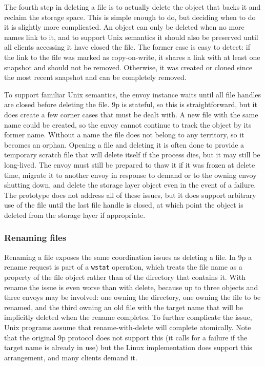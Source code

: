 The fourth step in deleting a file is to actually delete the object that backs it and reclaim the storage space. This is simple enough to do, but deciding when to do it is slightly more complicated. An object can only be deleted when no more names link to it, and to support Unix semantics it should also be preserved until all clients accessing it have closed the file. The former case is easy to detect: if the link to the file was marked as copy-on-write, it shares a link with at least one snapshot and should not be removed. Otherwise, it was created or cloned since the most recent snapshot and can be completely removed.

To support familiar Unix semantics, the envoy instance waits until all file handles are closed before deleting the file. 9p is stateful, so this is straightforward, but it does create a few corner cases that must be dealt with. A new file with the same name could be created, so the envoy cannot continue to track the object by its former name. Without a name the file does not belong to any territory, so it becomes an orphan. Opening a file and deleting it is often done to provide a temporary scratch file that will delete itself if the process dies, but it may still be long-lived. The envoy must still be prepared to thaw it if it was frozen at delete time, migrate it to another envoy in response to demand or to the owning envoy shutting down, and delete the storage layer object even in the event of a failure. The prototype does not address all of these issues, but it does support arbitrary use of the file until the last file handle is closed, at which point the object is deleted from the storage layer if appropriate.

\subsubsection{Renaming files}\label{sec:rename-operation}

Renaming a file exposes the same coordination issues as deleting a file. In 9p a rename request is part of a \texttt{wstat} operation, which treats the file name as a property of the file object rather than of the directory that contains it. With rename the issue is even worse than with delete, because up to three objects and three envoys may be involved: one owning the directory, one owning the file to be renamed, and the third owning an old file with the target name that will be implicitly deleted when the rename completes. To further complicate the issue, Unix programs assume that rename-with-delete will complete atomically. Note that the original 9p protocol does not support this (it calls for a failure if the target name is already in use) but the Linux implementation does support this arrangement, and many clients demand it.

